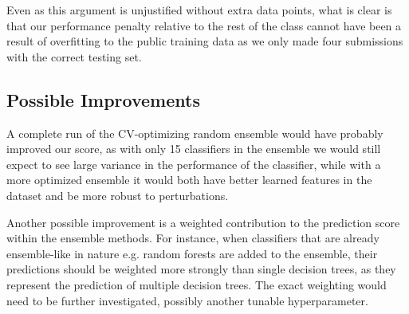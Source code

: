 \documentclass[10pt, preprint2]{aastex}
\begin{document}
Even as this argument is unjustified without extra data points, what is clear is that our performance penalty relative to the rest of the class cannot have been a result of overfitting to the public training data as we only made four submissions with the correct testing set.

\subsection{Possible Improvements}

A complete run of the CV-optimizing random ensemble would have probably improved our score, as with only 15 classifiers in the ensemble we would still expect to see large variance in the performance of the classifier, while with a more optimized ensemble it would both have better learned features in the dataset and be more robust to perturbations.

Another possible improvement is a weighted contribution to the prediction score within the ensemble methods. For instance, when classifiers that are already ensemble-like in nature e.g. random forests are added to the ensemble, their predictions should be weighted more strongly than single decision trees, as they represent the prediction of multiple decision trees. The exact weighting would need to be further investigated, possibly another tunable hyperparameter.
\end{document}

